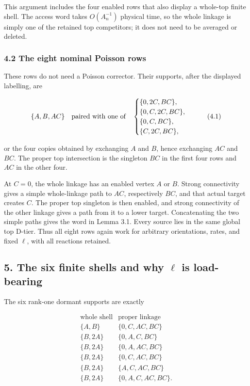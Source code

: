 This argument includes the four enabled rows that also display a
whole-top finite shell. The access word takes \(O(A_n^{-1})\) physical
time, so the whole linkage is simply one of the retained top
competitors; it does not need to be averaged or deleted.

\subsubsection{4.2 The eight nominal Poisson
rows}

These rows do not need a Poisson corrector. Their supports, after the
displayed labelling, are

\[
 \{A,B,AC\}\quad\hbox{paired with one of}\quad
 \begin{cases}
 \{0,2C,BC\},\\
 \{0,C,2C,BC\},\\
 \{0,C,BC\},\\
 \{C,2C,BC\},
 \end{cases}                                         \tag{4.1}
\]

or the four copies obtained by exchanging \(A\) and \(B\), hence
exchanging \(AC\) and \(BC\). The proper top intersection is the
singleton \(BC\) in the first four rows and \(AC\) in the other four.

At \(C=0\), the whole linkage has an enabled vertex \(A\) or \(B\).
Strong connectivity gives a simple whole-linkage path to \(AC\),
respectively \(BC\), and that actual target creates \(C\). The proper
top singleton is then enabled, and strong connectivity of the other
linkage gives a path from it to a lower target. Concatenating the two
simple paths gives the word in Lemma 3.1. Every source lies in the same
global top D-tier. Thus all eight rows again work for arbitrary
orientations, rates, and fixed \(\ell\), with all reactions retained.

\subsection{\texorpdfstring{5. The six finite shells and why \(\ell\) is
load-bearing}{5. The six finite shells and why \textbackslash ell is load-bearing}}

The six rank-one dormant supports are exactly

\[
 \begin{array}{c|l}
 \text{whole shell}&\text{proper linkage}\\ \hline
 \{A,B\}&\{0,C,AC,BC\}\\
 \{B,2A\}&\{0,A,C,BC\}\\
 \{B,2A\}&\{0,A,AC,BC\}\\
 \{B,2A\}&\{0,C,AC,BC\}\\
 \{B,2A\}&\{A,C,AC,BC\}\\
 \{B,2A\}&\{0,A,C,AC,BC\}.
 \end{array}                                         \tag{5.1}
\]

